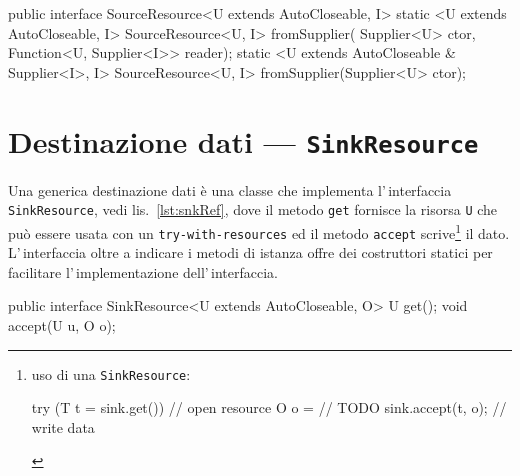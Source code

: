 \begin{elisting}[!htb]
\begin{javacode}
public interface SourceResource<U extends AutoCloseable, I> {
    static <U extends AutoCloseable, I> SourceResource<U, I> fromSupplier(
        Supplier<U> ctor, Function<U, Supplier<I>> reader);
    static <U extends AutoCloseable & Supplier<I>, I> SourceResource<U, I> fromSupplier(Supplier<U> ctor);
}
\end{javacode}
\caption{Metodi per creare una origine dati da un supplier}
\label{lst:srcRefSupp}
\end{elisting}


\section{Destinazione dati --- \texttt{SinkResource}} \label{sec:snkRes}
Una generica destinazione dati è una classe che implementa l'\,interfaccia
\texttt{SinkResource}, vedi lis.~\ref{lst:snkRef}, dove il metodo \texttt{get}
fornisce la risorsa \texttt{U} che può essere usata con un
\texttt{try-with-resources} ed il metodo \texttt{accept} scrive\footnote{%
    uso di una \texttt{SinkResource}:
    \begin{javacode}
    try (T t = sink.get()) {    // open resource
        O o = // TODO
        sink.accept(t, o);      // write data
    }
    \end{javacode}
} il dato.
L'\,interfaccia oltre a indicare i metodi di istanza offre dei costruttori
statici per facilitare l'\,implementazione dell'\,interfaccia.

\begin{elisting}[!htb]
\begin{javacode}
public interface SinkResource<U extends AutoCloseable, O> {
    U get();
    void accept(U u, O o);
}
\end{javacode}
\caption{Metodi per aprire la risorsa e scrivere i dati}
\label{lst:snkRef}
\end{elisting}

